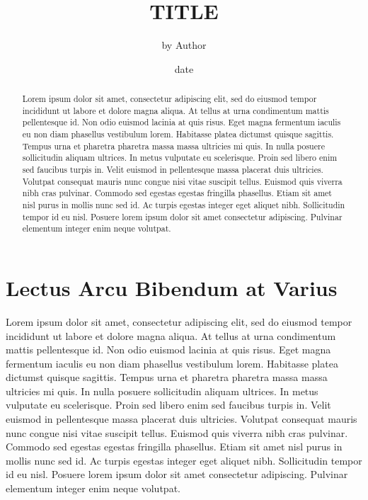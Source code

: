 \documentclass{article}
\title{TITLE}
\author{by Author}
\date{date}
\begin{document}
    \maketitle

    \pagebreak

    \begin{abstract}
        Lorem ipsum dolor sit amet, consectetur adipiscing elit, sed do eiusmod tempor incididunt ut labore et dolore magna aliqua. At tellus at urna condimentum mattis pellentesque id. Non odio euismod lacinia at quis risus. Eget magna fermentum iaculis eu non diam phasellus vestibulum lorem. Habitasse platea dictumst quisque sagittis. Tempus urna et pharetra pharetra massa massa ultricies mi quis. In nulla posuere sollicitudin aliquam ultrices. In metus vulputate eu scelerisque. Proin sed libero enim sed faucibus turpis in. Velit euismod in pellentesque massa placerat duis ultricies. Volutpat consequat mauris nunc congue nisi vitae suscipit tellus. Euismod quis viverra nibh cras pulvinar. Commodo sed egestas egestas fringilla phasellus. Etiam sit amet nisl purus in mollis nunc sed id. Ac turpis egestas integer eget aliquet nibh. Sollicitudin tempor id eu nisl. Posuere lorem ipsum dolor sit amet consectetur adipiscing. Pulvinar elementum integer enim neque volutpat.
    \end{abstract}

    \pagebreak

    \section{Lectus Arcu Bibendum at Varius}

    Lorem ipsum dolor sit amet, consectetur adipiscing elit, sed do eiusmod tempor incididunt ut labore et dolore magna aliqua. At tellus at urna condimentum mattis pellentesque id. Non odio euismod lacinia at quis risus. Eget magna fermentum iaculis eu non diam phasellus vestibulum lorem. Habitasse platea dictumst quisque sagittis. Tempus urna et pharetra pharetra massa massa ultricies mi quis. In nulla posuere sollicitudin aliquam ultrices. In metus vulputate eu scelerisque. Proin sed libero enim sed faucibus turpis in. Velit euismod in pellentesque massa placerat duis ultricies. Volutpat consequat mauris nunc congue nisi vitae suscipit tellus. Euismod quis viverra nibh cras pulvinar. Commodo sed egestas egestas fringilla phasellus. Etiam sit amet nisl purus in mollis nunc sed id. Ac turpis egestas integer eget aliquet nibh. Sollicitudin tempor id eu nisl. Posuere lorem ipsum dolor sit amet consectetur adipiscing. Pulvinar elementum integer enim neque volutpat.
\end{document}
